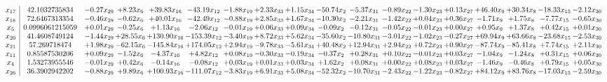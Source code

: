 \documentclass[9pt]{article}
\begin{document}
 \[\begin{array}{c| c c@{\hskip 2pt} c@{\hskip 2pt} c@{\hskip 2pt} c@{\hskip 2pt} c@{\hskip 2pt} c@{\hskip 2pt} c@{\hskip 2pt} c@{\hskip 2pt} c@{\hskip 2pt} c@{\hskip 2pt} c@{\hskip 2pt} c@{\hskip 2pt} c@{\hskip 2pt} c@{\hskip 2pt} c@{\hskip 2pt} c@{\hskip 2pt} }
 x_{17}   &  42.1032735834 & -0.27 x_{29} & +  8.23 x_{6} & + 39.83 x_{16} & -43.19 x_{12} & -1.88 x_{19} & +  2.33 x_{33} & +  1.15 x_{34} & -50.74 x_{2} & -5.37 x_{31} & -0.89 x_{22} & -1.30 x_{23} & +  0.13 x_{27} & + 46.40 x_{9} & + 30.34 x_{8} & -18.33 x_{15} & -2.12 x_{30}\\
 x_{18}   &  72.6467313354 & -0.46 x_{29} & -0.62 x_{6} & + 40.01 x_{16} & -42.49 x_{12} & -0.88 x_{19} & +  2.85 x_{33} & +  1.67 x_{34} & -10.30 x_{2} & -2.21 x_{31} & -1.42 x_{22} & +  0.04 x_{23} & +  0.36 x_{27} & -1.71 x_{9} & +  1.75 x_{8} & -7.77 x_{15} & -0.65 x_{30}\\
 x_{5}   &  0.0996061215059 & +  0.01 x_{29} & -0.25 x_{6} & +  1.13 x_{16} & -2.06 x_{12} & -0.01 x_{19} & +  0.06 x_{33} & +  0.09 x_{34} & -0.09 x_{2} & -0.12 x_{31} & -0.05 x_{22} & -0.01 x_{23} & +  0.00 x_{27} & +  0.95 x_{9} & +  1.37 x_{8} & +  0.42 x_{15} & +  0.01 x_{30}\\
 x_{20}   &  41.4608749124 & -1.44 x_{29} & + 28.55 x_{6} & + 130.90 x_{16} & -153.39 x_{12} & -3.40 x_{19} & +  8.72 x_{33} & +  5.62 x_{34} & -35.60 x_{2} & -10.80 x_{31} & -3.01 x_{22} & -1.02 x_{23} & -0.27 x_{27} & + 69.94 x_{9} & + 63.66 x_{8} & -23.68 x_{15} & -2.53 x_{30}\\
 x_{21}   &  57.269718474 & +  1.98 x_{29} & -62.15 x_{6} & -145.84 x_{16} & + 174.05 x_{12} & +  2.94 x_{19} & -9.78 x_{33} & -5.61 x_{34} & + 40.48 x_{2} & + 12.94 x_{31} & +  2.94 x_{22} & +  0.72 x_{23} & +  0.90 x_{27} & -87.74 x_{9} & -85.41 x_{8} & +  7.74 x_{15} & +  2.11 x_{30}\\
 x_{11}   &  0.85587530206 & +  0.09 x_{29} & -1.52 x_{6} & -4.37 x_{16} & +  4.82 x_{12} & +  0.08 x_{19} & -0.30 x_{33} & -0.19 x_{34} & -0.37 x_{2} & +  0.28 x_{31} & +  0.10 x_{22} & -0.01 x_{23} & +  0.03 x_{27} & -1.04 x_{9} & -1.24 x_{8} & +  0.31 x_{15} & +  0.06 x_{30}\\
 x_{4}   &  1.53273955546 & -0.01 x_{29} & +  0.42 x_{6} & -0.14 x_{16} & -0.08 x_{12} & +  0.03 x_{19} & +  0.01 x_{33} & +  0.03 x_{34} & +  1.62 x_{2} & +  0.08 x_{31} & +  0.00 x_{22} & +  0.08 x_{23} & +  0.03 x_{27} & -1.46 x_{9} & -0.46 x_{8} & +  0.79 x_{15} & +  0.05 x_{30}\\
 x_{26}   &  36.3902942202 & -0.88 x_{29} & +  9.89 x_{6} & + 100.93 x_{16} & -111.07 x_{12} & -3.83 x_{19} & +  6.91 x_{33} & +  5.08 x_{34} & -52.32 x_{2} & -10.70 x_{31} & -2.43 x_{22} & -1.22 x_{23} & -0.82 x_{27} & + 84.12 x_{9} & + 83.76 x_{8} & -17.03 x_{15} & -2.59 x_{30}\\

\end{array}\]
\end{document}
